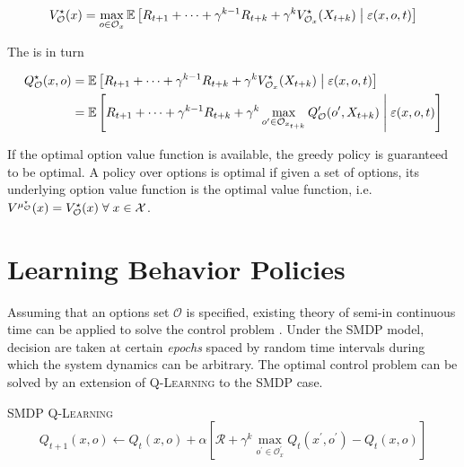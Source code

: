 \begin{equation}
V_{\mathcal{O}}^\star(x) = \max_{o \in \mathcal{O}_x} \operatorname{\mathbb{E}} \left[ R_{t+1} + \dots + \gamma^{k-1}R_{t+k} + \gamma^k V_{\mathcal{O}_x}^\star(X_{t+k})  \;\middle\vert\; \varepsilon(x, o, t) \right]
\end{equation}

The  is in turn

\begin{align}
Q_{\mathcal{O}}^\star(x, o) &= \operatorname{\mathbb{E}} \left[ R_{t+1} + \dots +
\gamma^{k-1}R_{t+k} + \gamma^k V_{\mathcal{O}_x}^\star(X_{t+k})  \;\middle\vert\;
\varepsilon(x, o, t) \right] \notag \\
&= \operatorname{\mathbb{E}} \left[ R_{t+1} + \dots + \gamma^{k-1}R_{t+k} + \gamma^k
\max_{o^\prime \in \mathcal{O}_{x_{t+k}}} Q_\mathcal{O}^\prime(o^\prime, X_{t+k}) 
\;\middle\vert\; \varepsilon(x, o, t) \right]
\label{eq:optimal-option-value-function}
\end{align}

If the optimal option value function is
available, the greedy policy is guaranteed to be optimal. A policy over options is
optimal if given a set of options, its underlying option value function is the optimal
value function, i.e. $V^{\mu_\mathcal{O}^\star}(x) = V_\mathcal{O}^\star(x)\; \forall \; x \in \mathcal{X}$.

\section{Learning Behavior Policies}

Assuming that an options set $\mathcal{O}$ is specified, existing theory
of  semi-\mdps in continuous time can be
applied to solve the control problem \parencite{Puterman1994, Bradtke1994}. Under the SMDP model, decision are taken at certain \textit{epochs} spaced by random time intervals during which the system dynamics can be arbitrary. The optimal control problem can be solved by an
extension of \textsc{Q-Learning} to the SMDP case.

\begin{defn}{\textsc{SMDP Q-Learning}}
\begin{equation}
Q_{t+1}(x, o) \leftarrow Q_{t}(x, o) + \alpha \left[ \mathcal{R} + \gamma^k
\max_{o^\prime \in \mathcal{O}_x^\prime} Q_{t}(x^\prime, o^\prime) -
Q_t(x, o) \right]
\label{eq:smdp-qlearning}
\end{equation}
\end{defn}

